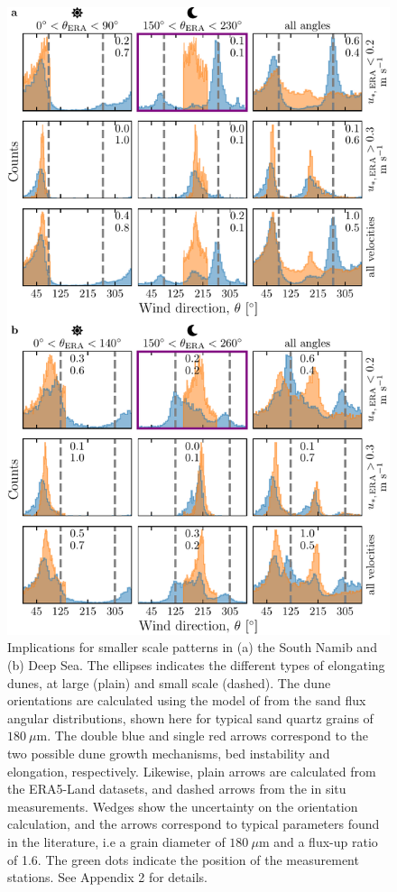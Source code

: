 \begin{figure}
  \centering
  \includegraphics[scale=1]{Figures/Figure6.pdf}
  \caption{Implications for smaller scale patterns in (a) the South Namib and (b) Deep Sea. The ellipses indicates the different types of elongating dunes, at large (plain) and small scale (dashed). The dune orientations are calculated using the model of \citet{Cour14} from the sand flux angular distributions, shown here for typical sand quartz grains of $180~\mu$m. The double blue and single red arrows correspond to the two possible dune growth mechanisms, bed instability and elongation, respectively. Likewise, plain arrows are calculated from the ERA5-Land datasets, and dashed arrows from the in situ measurements. Wedges show the uncertainty on the orientation calculation, and the arrows correspond to typical parameters found in the literature, i.e a grain diameter of $180~\mu$m and a flux-up ratio of 1.6. The green dots indicate the position of the measurement stations. See Appendix 2 for details.}
  \label{Fig6}
\end{figure}

